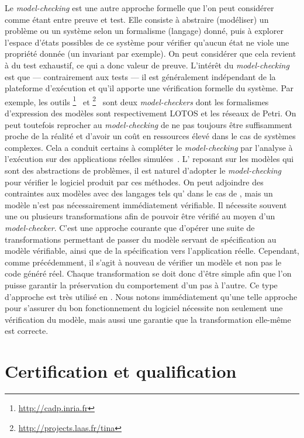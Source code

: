 Le \emph{model-checking} est une autre approche formelle que l'on peut
considérer comme étant entre preuve et test. Elle consiste à abstraire
(modéliser) un problème ou un système selon un formalisme (langage) donné, puis
à explorer l'espace d'états possibles de ce système pour vérifier qu'aucun
état ne viole une propriété donnée (un invariant par exemple). On peut
considérer que cela revient à du test exhaustif, ce qui a donc valeur de
preuve. L'intérêt du \emph{model-checking} est que --- contrairement aux tests
--- il est généralement indépendant de la plateforme d'exécution et qu'il
apporte une vérification formelle du système. Par exemple, les outils
{\cadp}\footnote{\url{http://cadp.inria.fr}}~\cite{Garavel2011} et
{\tina}\footnote{\url{http://projects.laas.fr/tina}}~\cite{Berthomieu2004} sont
deux \emph{model-checkers} dont les formalismes d'expression des modèles sont
respectivement LOTOS et les réseaux de Petri. On peut toutefois reprocher au \emph{model-checking} de ne pas
toujours être suffisamment proche de la réalité et d'avoir un coût en
ressources élevé dans le cas de systèmes complexes. Cela a conduit certains à
compléter le \emph{model-checking} par l'analyse à l'exécution sur des
applications réelles simulées~\cite{Bayazit2005}. L'{\idm} reposant sur les
modèles qui sont des abstractions de problèmes, il est naturel d'adopter le
\emph{model-checking} pour vérifier le logiciel produit par ces méthodes. On
peut adjoindre des contraintes aux modèles avec des langages tels qu'{\ocl}
dans le cas de {\uml}, mais un modèle n'est pas nécessairement immédiatement
vérifiable. Il nécessite souvent une ou plusieurs transformations afin de
pouvoir être vérifié au moyen d'un \emph{model-checker}. C'est une approche
courante que d'opérer une suite de transformations permettant de passer du
modèle servant de spécification au modèle vérifiable, ainsi que de la
spécification vers l'application réelle.  Cependant, comme précédemment, il
s'agit à nouveau de vérifier un modèle et non pas le code généré réel. Chaque
transformation se doit donc d'être simple afin que l'on puisse garantir la
préservation du comportement d'un pas à l'autre. Ce type d'approche est très
utilisé en {\idm}. Nous notons immédiatement qu'une telle approche pour
s'assurer du bon fonctionnement du logiciel nécessite non seulement une
vérification du modèle, mais aussi une garantie que la transformation elle-même
est correcte.

\section{Certification et qualification}
\label{ch:verification:sec:certifqualif}

